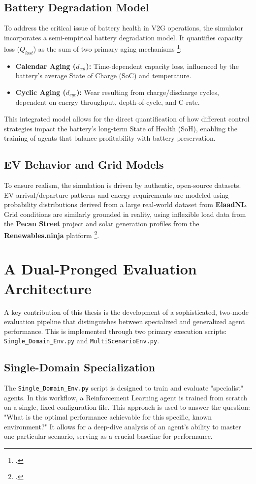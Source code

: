 \subsection{Battery Degradation Model}
To address the critical issue of battery health in V2G operations, the simulator incorporates a semi-empirical battery degradation model. It quantifies capacity loss ($Q_{lost}$) as the sum of two primary aging mechanisms \footcite{orfanoudakis2024ev2gym}:
\begin{itemize}
    \item \textbf{Calendar Aging ($d_{cal}$):} Time-dependent capacity loss, influenced by the battery's average State of Charge (SoC) and temperature.
    \item \textbf{Cyclic Aging ($d_{cyc}$):} Wear resulting from charge/discharge cycles, dependent on energy throughput, depth-of-cycle, and C-rate.
\end{itemize}
This integrated model allows for the direct quantification of how different control strategies impact the battery's long-term State of Health (SoH), enabling the training of agents that balance profitability with battery preservation.

\subsection{EV Behavior and Grid Models}
To ensure realism, the simulation is driven by authentic, open-source datasets. EV arrival/departure patterns and energy requirements are modeled using probability distributions derived from a large real-world dataset from \textbf{ElaadNL}. Grid conditions are similarly grounded in reality, using inflexible load data from the \textbf{Pecan Street} project and solar generation profiles from the \textbf{Renewables.ninja} platform \footcite{orfanoudakis2024ev2gym}.

\section{A Dual-Pronged Evaluation Architecture}
A key contribution of this thesis is the development of a sophisticated, two-mode evaluation pipeline that distinguishes between specialized and generalized agent performance. This is implemented through two primary execution scripts: \texttt{Single\_Domain\_Env.py} and \texttt{MultiScenarioEnv.py}.

\subsection{Single-Domain Specialization}
The \texttt{Single\_Domain\_Env.py} script is designed to train and evaluate "specialist" agents. In this workflow, a Reinforcement Learning agent is trained from scratch on a single, fixed configuration file. This approach is used to answer the question: "What is the optimal performance achievable for this specific, known environment?" It allows for a deep-dive analysis of an agent's ability to master one particular scenario, serving as a crucial baseline for performance.


